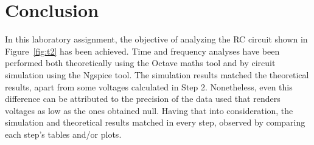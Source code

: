 \section{Conclusion}
\label{sec:conclusion}

In this laboratory assignment, the objective of analyzing the RC circuit shown in Figure~\ref{fig:t2} has been achieved. Time and frequency analyses have been performed both theoretically using the Octave maths tool and by circuit simulation using the Ngspice tool. The simulation results matched the theoretical results, apart from some voltages calculated in Step 2. Nonetheless, even this difference can be attributed to the precision of the data used that renders voltages as low as the ones obtained null. Having that into consideration, the simulation and theoretical results matched in every step, observed by comparing each step's tables and/or plots. 
